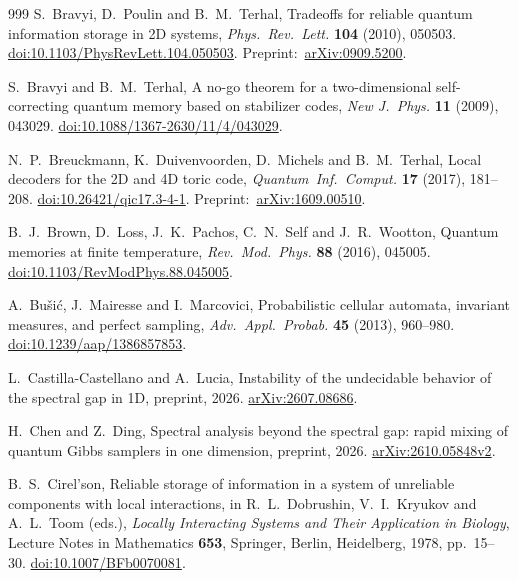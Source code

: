 \begin{thebibliography}{999}
S.~Bravyi, D.~Poulin and B.~M.~Terhal,
Tradeoffs for reliable quantum information storage in 2D systems,
\emph{Phys.~Rev.~Lett.} \textbf{104} (2010), 050503.
\href{https://doi.org/10.1103/PhysRevLett.104.050503}{doi:10.1103/PhysRevLett.104.050503}.
Preprint:~\href{https://arxiv.org/abs/0909.5200}{arXiv:0909.5200}.

S.~Bravyi and B.~M.~Terhal,
A no-go theorem for a two-dimensional self-correcting quantum memory based on stabilizer codes,
\emph{New J.~Phys.} \textbf{11} (2009), 043029.
\href{https://doi.org/10.1088/1367-2630/11/4/043029}{doi:10.1088/1367-2630/11/4/043029}.

N.~P.~Breuckmann, K.~Duivenvoorden, D.~Michels and B.~M.~Terhal,
Local decoders for the 2D and 4D toric code,
\emph{Quantum~Inf.~Comput.} \textbf{17} (2017), 181--208.
\href{https://doi.org/10.26421/qic17.3-4-1}{doi:10.26421/qic17.3-4-1}.
Preprint:~\href{https://arxiv.org/abs/1609.00510}{arXiv:1609.00510}.

B.~J.~Brown, D.~Loss, J.~K.~Pachos, C.~N.~Self and J.~R.~Wootton,
Quantum memories at finite temperature,
\emph{Rev.~Mod.~Phys.} \textbf{88} (2016), 045005.
\href{https://doi.org/10.1103/RevModPhys.88.045005}{doi:10.1103/RevModPhys.88.045005}.

A.~Bu\v{s}i\'{c}, J.~Mairesse and I.~Marcovici,
Probabilistic cellular automata, invariant measures, and perfect sampling,
\emph{Adv.~Appl.~Probab.} \textbf{45} (2013), 960--980.
\href{https://doi.org/10.1239/aap/1386857853}{doi:10.1239/aap/1386857853}.

L.~Castilla-Castellano and A.~Lucia,
Instability of the undecidable behavior of the spectral gap in 1D,
preprint, 2026.
\href{https://arxiv.org/abs/2607.08686}{arXiv:2607.08686}.

H.~Chen and Z.~Ding,
Spectral analysis beyond the spectral gap: rapid mixing of quantum
Gibbs samplers in one dimension,
preprint, 2026.
\href{https://arxiv.org/abs/2610.05848v2}{arXiv:2610.05848v2}.

B.~S.~Cirel'son,
Reliable storage of information in a system of unreliable components
with local interactions,
in R.~L.~Dobrushin, V.~I.~Kryukov and A.~L.~Toom (eds.),
\emph{Locally Interacting Systems and Their Application in Biology},
Lecture Notes in Mathematics \textbf{653},
Springer, Berlin, Heidelberg, 1978, pp.~15--30.
\href{https://doi.org/10.1007/BFb0070081}{doi:10.1007/BFb0070081}.


\end{thebibliography}
